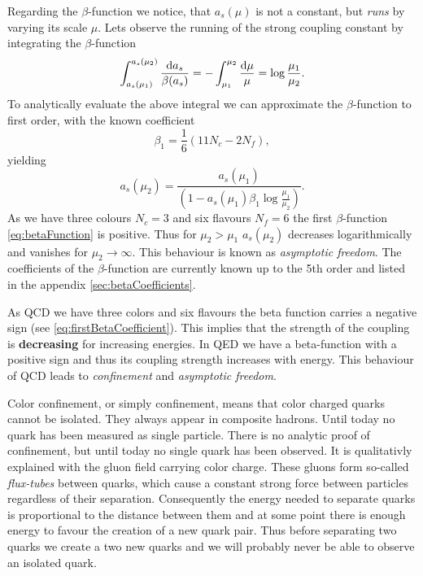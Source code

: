 \documentclass[../../index.tex]{subfiles}
\begin{document}
Regarding the $\beta$-function we notice, that $a_s(\mu)$ is not a constant, but
\textit{runs} by varying its scale $\mu$. Lets observe the running of the strong
coupling constant by integrating the $\beta$-function 
\begin{equation}
  \int_{a_s(\mu_1)}^{a_s(\mu_2)}\frac{\dif a_s}{\beta(a_s)} = - \int_{\mu_1}^{\mu_2} \frac{\dif \mu}{\mu} = \log \frac{\mu_1}{\mu_2}.
\end{equation}
To analytically evaluate the above integral we can approximate the $\beta$-function to first order, with the known
coefficient
\begin{equation}
  \label{eq:firstBetaCoefficient}
  \beta_1 = \frac{1}{6}(11 N_c - 2 N_f),
\end{equation}
yielding
\begin{equation}
  a_s(\mu_2) = \frac{a_s(\mu_1)}{\left( 1 - a_s(\mu_1) \beta_1 \log\frac{\mu_1}{\mu_2} \right)}.
\end{equation}
As we have three colours $N_c=3$ and six flavours $N_f=6$ the first
$\beta$-function \ref{eq:betaFunction} is positive. Thus for $\mu_2>\mu_1$ $a_s(\mu_2)$ decreases
logarithmically and vanishes for $\mu_2 \to \infty$. This behaviour is known as
\textit{asymptotic freedom}.
The coefficients of the $\beta$-function are currently known up to the 5th
order and listed in the appendix \ref{sec:betaCoefficients}.

As QCD we have three colors and six flavours the beta function carries a
negative sign (see \cref{eq:firstBetaCoefficient}). This implies that the
strength of the coupling is \textbf{decreasing} for increasing energies. In QED
we have a beta-function with a positive sign and thus its coupling strength
increases with energy. This behaviour of QCD leads to \textit{confinement} and
\textit{asymptotic freedom}.

Color confinement, or simply confinement, means that color charged quarks cannot
be isolated. They always appear in composite hadrons. Until today no quark has
been measured as single particle. There is no analytic proof of confinement, but
until today no single quark has been observed. It is qualitativly explained with
the gluon field carrying color charge. These gluons form so-called
\textit{flux-tubes} between quarks, which cause a constant strong force between
particles regardless of their separation. Consequently the energy needed to
separate quarks is proportional to the distance between them and at some point
there is enough energy to favour the creation of a new quark pair. Thus before
separating two quarks we create a two new quarks and we will probably never be
able to observe an isolated quark.
\end{document}
